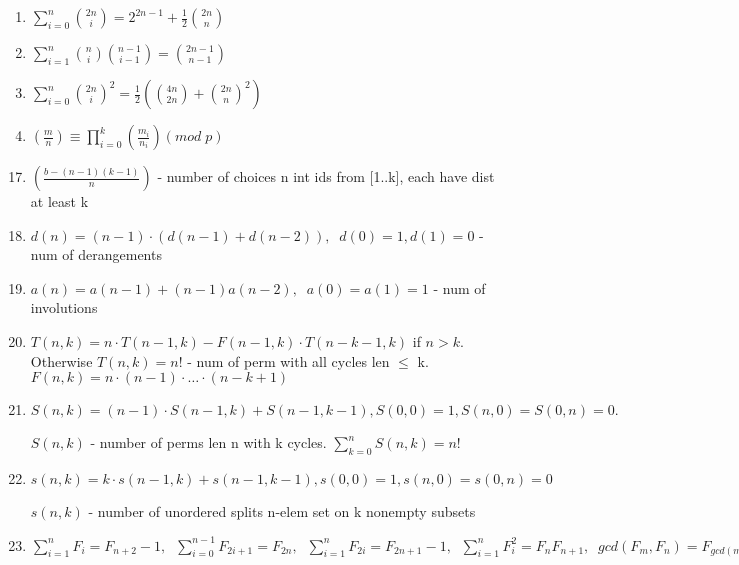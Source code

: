 \begin{Large}
\begin{minipage}{0.5\textwidth}
\begin{flushleft}
\begin{enumerate}
				\item $\sum \limits_{i=0}^n{2n \choose i}=2^{2n-1}+\frac{1}{2}{2n \choose n}$
				\item $\sum \limits_{i=1}^n{n \choose i}{n-1 \choose i-1}={2n-1 \choose n-1}$
				\item $\sum \limits_{i=0}^n{2n \choose i}^2=\frac{1}{2} \left( {4n \choose 2n}+{2n \choose n}^2 \right)$
				\item $\left(\frac{m}{n}\right) \equiv \prod_{i=0}^{k} \left(\frac{m_{i}}{n_{i}}\right) (mod\; p)$
			\end{enumerate}
		\end{flushleft}
	\end{minipage}
	\end{Large}
\begin{large}
	\begin{enumerate}
		\setcounter{enumi}{16}
		\item $\left( \frac{b-(n-1)(k-1)}{n} \right)$ - number of choices n int ids from [1..k], each have dist at least k
		\item $d(n)=(n-1) \cdot (d(n-1)+d(n-2)),\;\; d(0)=1,d(1)=0$ - num of derangements
		\item $a(n)=a(n-1) + (n-1)a(n-2),\;\;a(0) = a(1) = 1$ - num of involutions
		\item $T(n, k)= n \cdot T(n-1, k) - F(n-1, k) \cdot T(n-k-1, k)$ if $n > k$. Otherwise $T(n,k)=n!$ - num of perm with all cycles len $\leq$ k. $F(n, k) = n \cdot (n - 1) \cdot … \cdot (n - k + 1)$
		\item $S(n,k)=(n-1) \cdot S(n-1,k)+S(n-1,k-1), S(0,0)=1,S(n,0)=S(0,n)=0.$ \par
		 $S(n,k)$ - number of perms len n with k cycles. $\sum_{k=0}^{n}S(n,k) = n!$
		\item $s(n,k)=k \cdot s(n-1,k)+s(n-1,k-1), s(0,0)=1,s(n,0)=s(0,n)=0$ \par
		 $s(n,k)$ - number of unordered splits n-elem set on k nonempty subsets
		\item $\sum\limits_{i=1}^{n}F_i=F_{n+2}-1,\;\; \sum\limits_{i=0}^{n-1}F_{2i+1}=F_{2n},\;\; \sum\limits_{i=1}^{n}F_{2i}=F_{2n+1}-1,\;\;
		\sum\limits_{i=1}^{n}F_{i}^{2}=F_nF_{n+1},\;\;
		gcd(F_m, F_n)=F_{gcd(m, n)}$
	\end{enumerate}
\end{large}